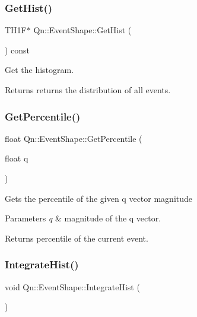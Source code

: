 \subsubsection{\texorpdfstring{Get\+Hist()}{GetHist()}}
{\footnotesize\ttfamily T\+H1F$\ast$ Qn\+::\+Event\+Shape\+::\+Get\+Hist (\begin{DoxyParamCaption}{ }\end{DoxyParamCaption}) const\hspace{0.3cm}{\ttfamily [inline]}}

Get the histogram. \begin{DoxyReturn}{Returns}
returns the distribution of all events. 
\end{DoxyReturn}
\mbox{\label{classQn_1_1EventShape_a05bdd3d71c99c4a4dc192cbd861198df}} 
\subsubsection{\texorpdfstring{Get\+Percentile()}{GetPercentile()}}
{\footnotesize\ttfamily float Qn\+::\+Event\+Shape\+::\+Get\+Percentile (\begin{DoxyParamCaption}\item[{float}]{q }\end{DoxyParamCaption})\hspace{0.3cm}{\ttfamily [inline]}}

Gets the percentile of the given q vector magnitude 
\begin{DoxyParams}{Parameters}
{\em q} & magnitude of the q vector. \\
\hline
\end{DoxyParams}
\begin{DoxyReturn}{Returns}
percentile of the current event. 
\end{DoxyReturn}
\mbox{\label{classQn_1_1EventShape_ad00484e1a53ab0e3c56eafe7f199c67b}} 
\subsubsection{\texorpdfstring{Integrate\+Hist()}{IntegrateHist()}}
{\footnotesize\ttfamily void Qn\+::\+Event\+Shape\+::\+Integrate\+Hist (\begin{DoxyParamCaption}{ }\end{DoxyParamCaption})}

